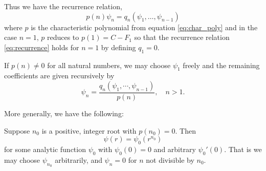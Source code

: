 \documentclass{amsart}
\begin{document}
Thus we have the recurrence relation,
\begin{equation}
\label{eq:recurrence}
p(n) \psi_n = q_n (\psi_1, \dots, \psi_{n-1})
\end{equation}
where \(p\) is the characteristic polynomial from equation \eqref{eq:char_poly} and in the case \(n=1\), \(p\) reduces to \(p(1) = C - F_1\) so that the recurrence relation \eqref{eq:recurrence} holds for \(n=1\) by defining \(q_1 = 0\).

If \(p(n) \ne 0\) for all natural numbers, we may choose \(\psi_1\) freely and the remaining coefficients are given recursively by
\[
\psi_n = \frac{q_n(\psi_1, \cdots, \psi_{n-1})}{p(n)}, \quad n > 1. 
\]

More generally, we have the following:

\begin{lemma}
\label{lem:heuristic_asymptotics}
Suppose \(n_0\) is a positive, integer root with \(p(n_0) = 0\). Then
\[
\psi(r) = \psi_0(r^{n_0})
\]
for some analytic function \(\psi_0\) with \(\psi_0(0) = 0\) and arbitrary \(\psi_0'(0)\). That is we may choose \(\psi_{n_0}\) arbitrarily, and \(\psi_n = 0\) for \(n\) not divisible by \(n_0\).
\end{lemma}
\end{document}
